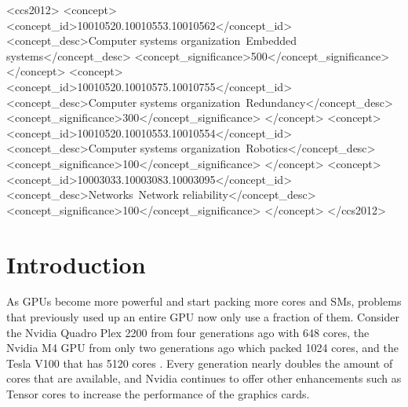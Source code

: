 \documentclass[sigconf]{acmart}
\begin{document}
\begin{CCSXML}
<ccs2012>
 <concept>
  <concept_id>10010520.10010553.10010562</concept_id>
  <concept_desc>Computer systems organization~Embedded systems</concept_desc>
  <concept_significance>500</concept_significance>
 </concept>
 <concept>
  <concept_id>10010520.10010575.10010755</concept_id>
  <concept_desc>Computer systems organization~Redundancy</concept_desc>
  <concept_significance>300</concept_significance>
 </concept>
 <concept>
  <concept_id>10010520.10010553.10010554</concept_id>
  <concept_desc>Computer systems organization~Robotics</concept_desc>
  <concept_significance>100</concept_significance>
 </concept>
 <concept>
  <concept_id>10003033.10003083.10003095</concept_id>
  <concept_desc>Networks~Network reliability</concept_desc>
  <concept_significance>100</concept_significance>
 </concept>
</ccs2012>
\end{CCSXML}




\maketitle

\section{Introduction}
As GPUs become more powerful and start packing more cores and SMs, problems that previously used up an entire GPU now only use a fraction of them. Consider the Nvidia Quadro Plex 2200 from four generations ago with 648 cores, the Nvidia M4 GPU from only two generations ago which packed 1024 cores, and the Tesla V100 that has 5120 cores \cite{nvidia_all_gpus}. Every generation nearly doubles the amount of cores that are available, and Nvidia continues to offer other enhancements such as Tensor cores to increase the performance of the graphics cards. 
\end{document}
